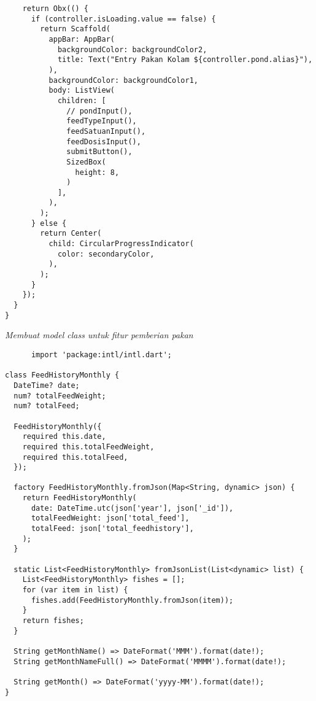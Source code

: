 \begin{lstlisting}
    return Obx(() {
      if (controller.isLoading.value == false) {
        return Scaffold(
          appBar: AppBar(
            backgroundColor: backgroundColor2,
            title: Text("Entry Pakan Kolam ${controller.pond.alias}"),
          ),
          backgroundColor: backgroundColor1,
          body: ListView(
            children: [
              // pondInput(),
              feedTypeInput(),
              feedSatuanInput(),
              feedDosisInput(),
              submitButton(),
              SizedBox(
                height: 8,
              )
            ],
          ),
        );
      } else {
        return Center(
          child: CircularProgressIndicator(
            color: secondaryColor,
          ),
        );
      }
    });
  }
}
	\end{lstlisting}

	\textit{Membuat model class untuk fitur pemberian pakan}
	\begin{lstlisting}
	  import 'package:intl/intl.dart';

class FeedHistoryMonthly {
  DateTime? date;
  num? totalFeedWeight;
  num? totalFeed;

  FeedHistoryMonthly({
    required this.date,
    required this.totalFeedWeight,
    required this.totalFeed,
  });

  factory FeedHistoryMonthly.fromJson(Map<String, dynamic> json) {
    return FeedHistoryMonthly(
      date: DateTime.utc(json['year'], json['_id']),
      totalFeedWeight: json['total_feed'],
      totalFeed: json['total_feedhistory'],
    );
  }

  static List<FeedHistoryMonthly> fromJsonList(List<dynamic> list) {
    List<FeedHistoryMonthly> fishes = [];
    for (var item in list) {
      fishes.add(FeedHistoryMonthly.fromJson(item));
    }
    return fishes;
  }

  String getMonthName() => DateFormat('MMM').format(date!);
  String getMonthNameFull() => DateFormat('MMMM').format(date!);

  String getMonth() => DateFormat('yyyy-MM').format(date!);
}

	\end{lstlisting}

